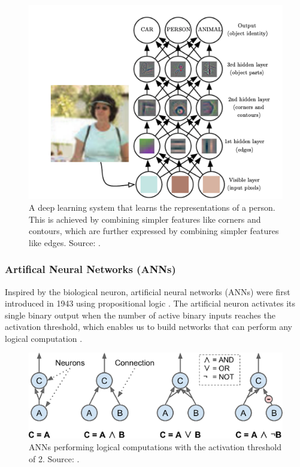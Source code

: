\documentclass[a4paper,11pt,oneside]{article}
\begin{document}
  \begin{figure}[ht]
    \begin{center}
      \includegraphics[width=.8\textwidth]{deep_learning.png}
    \end{center}
    \caption{A deep learning system that learns the representations of a person. This is achieved by combining simpler
    features like corners and contours, which are further expressed by combining simpler features like edges. Source:
    \cite{goodfellow2016deep}.}
  \end{figure}

  \subsubsection{Artifical Neural Networks (ANNs)}

  Inspired by the biological neuron, artificial neural networks (ANNs) were first introduced in 1943 using propositional
  logic \cite{mcculloch1943logical}. The artificial neuron activates its single binary output when the number of active
  binary inputs reaches the activation threshold, which enables us to build networks that can perform any logical
  computation \cite{geron2019hands, mcculloch1943logical}.

  \begin{figure}[ht]
    \begin{center}
      \includegraphics[width=.8\textwidth]{ann_logic_computations.png}
    \end{center}
    \caption{ANNs performing logical computations with the activation threshold of 2. Source: \cite{geron2019hands}.}
  \end{figure}
\end{document}
